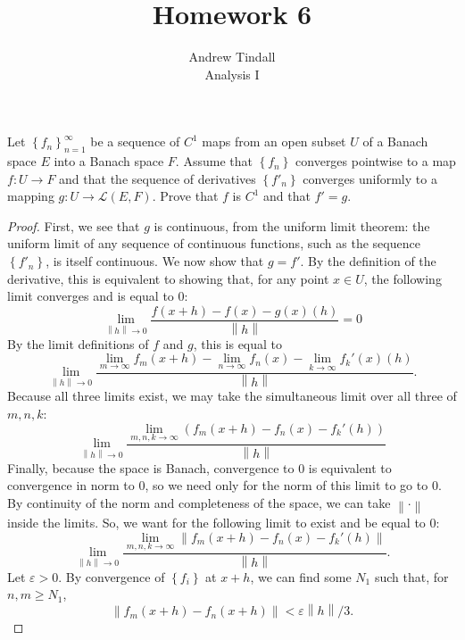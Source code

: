 \documentclass[12pt]{article}
\theoremstyle{definition}
\newenvironment{problem}[2][Problem]{\begin{trivlist}
\item[\hskip \labelsep {\bfseries #1}\hskip \labelsep {\bfseries #2.}]}{\end{trivlist}}
\begin{document}
 
 
\title{Homework 6}
\author{Andrew Tindall\\
Analysis I}
 
\maketitle
\begin{problem}{1}
	Let $\left\{ f_n \right\}_{n=1}^\infty$ be a sequence of $C^1$ maps from an open subset $U$ of a Banach space $E$ into a Banach space $F$. Assume that $\left\{ f_n \right\}$ converges pointwise to a map $f: U \to F$	and that the sequence of derivatives $\left\{ f'_n \right\}$ converges uniformly to a mapping $g: U \to \mathcal{L}(E,F)$. Prove that $f$ is $C^1$ and that $f' = g$.
	\begin{proof}
		First, we see that $g$ is continuous, from the uniform limit theorem: the uniform limit of any sequence of continuous functions, such as the sequence $\left\{ f'_n \right\}$, is itself continuous. We now show that $g = f'$. By the definition of the derivative, this is equivalent to showing that, for any point $x \in U$, the following limit converges and is equal to $0$:
		\[\lim_{\left \lVert { h } \right \lVert  \to 0}\frac{f(x + h) - f(x) - g(x)(h)}{\left \lVert { h } \right \lVert } = 0\]
		By the limit definitions of $f$ and $g$, this is equal to 
		\[ \lim_{\left \lVert {  h } \right \lVert  \to 0} \frac{\lim_{m \to \infty}f_m(x + h) - \lim_{n \to \infty}f_n(x) - \lim_{k \to \infty} f_k'(x)(h)}{\left \lVert {  h } \right \lVert }.\]
		Because all three limits exist, we may take the simultaneous limit over all three of $m, n, k$:
		\[ \lim_{\left \lVert { h } \right \lVert  \to 0} \frac{\lim_{m,n,k \to \infty}\left( f_m(x + h) - f_n(x) - f_k'(h) \right)}{\left \lVert { h } \right \lVert }\]
		Finally, because the space is Banach, convergence to $0$ is equivalent to convergence in norm to $0$, so we need only for the norm of this limit to go to $0$. By continuity of the norm and completeness of the space, we can take $\left \lVert {  \cdot } \right \lVert $ inside the limits. So, we want for the following limit to exist and be equal to $0$:
		\[ \lim_{\left \lVert { h } \right \lVert \to 0} \frac{\lim_{m,n,k \to \infty} \left \lVert { f_m(x + h) - f_n(x) - f_k'(h) } \right \lVert }{\left \lVert { h } \right \lVert }.\]
		Let $\varepsilon > 0$. By convergence of $\left\{ f_i \right\}$ at $x + h$, we can find some $N_1$ such that, for $n, m \geq N_1$,
		\[\left \lVert { f_m(x + h) - f_n(x + h) } \right \lVert < \varepsilon\left \lVert { h } \right \lVert /3.\]

\end{proof}
\end{problem}
\end{document}
